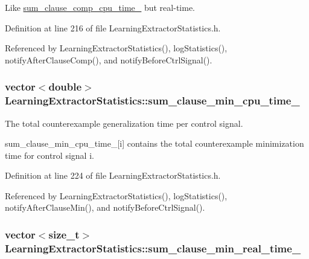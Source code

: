Like \hyperlink{classLearningExtractorStatistics_a3e3c198d4480eb0b74410126bc2040e9}{sum\-\_\-clause\-\_\-comp\-\_\-cpu\-\_\-time\-\_\-} but real-\/time. 



Definition at line 216 of file Learning\-Extractor\-Statistics.\-h.



Referenced by Learning\-Extractor\-Statistics(), log\-Statistics(), notify\-After\-Clause\-Comp(), and notify\-Before\-Ctrl\-Signal().

\hypertarget{classLearningExtractorStatistics_a61118ceb2f3bd2072ce584971fb37ae2}{
\subsubsection[{sum\-\_\-clause\-\_\-min\-\_\-cpu\-\_\-time\-\_\-}]{\setlength{\rightskip}{0pt plus 5cm}vector$<$double$>$ Learning\-Extractor\-Statistics\-::sum\-\_\-clause\-\_\-min\-\_\-cpu\-\_\-time\-\_\-\hspace{0.3cm}{\ttfamily [protected]}}}\label{classLearningExtractorStatistics_a61118ceb2f3bd2072ce584971fb37ae2}


The total counterexample generalization time per control signal. 

sum\-\_\-clause\-\_\-min\-\_\-cpu\-\_\-time\-\_\-\mbox{[}i\mbox{]} contains the total counterexample minimization time for control signal i. 

Definition at line 224 of file Learning\-Extractor\-Statistics.\-h.



Referenced by Learning\-Extractor\-Statistics(), log\-Statistics(), notify\-After\-Clause\-Min(), and notify\-Before\-Ctrl\-Signal().

\hypertarget{classLearningExtractorStatistics_a552f8b12efb9b8460efd32d805e66eac}{
\subsubsection[{sum\-\_\-clause\-\_\-min\-\_\-real\-\_\-time\-\_\-}]{\setlength{\rightskip}{0pt plus 5cm}vector$<$size\-\_\-t$>$ Learning\-Extractor\-Statistics\-::sum\-\_\-clause\-\_\-min\-\_\-real\-\_\-time\-\_\-\hspace{0.3cm}{\ttfamily [protected]}}}\label{classLearningExtractorStatistics_a552f8b12efb9b8460efd32d805e66eac}


